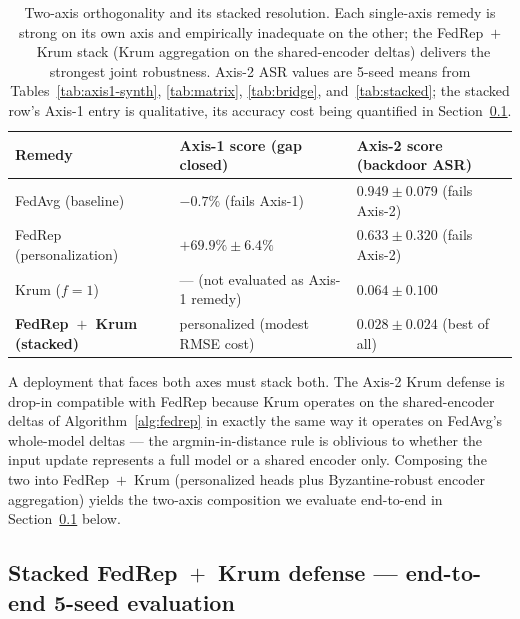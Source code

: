 \documentclass[a4paper,fleqn,doubleblind]{cas-sc}
\newcommand{\tblhead}{\rowcolor{tblHeadBg}}
\newcommand{\zebra}{\rowcolors{2}{tblAltBg}{white}}
\newcommand{\tblhead}{}
\newcommand{\zebra}{}
\begin{document}
\begin{table}[pos=tbp]
\centering
\footnotesize
\setlength{\tabcolsep}{6pt}
\renewcommand{\arraystretch}{1.2}
\caption{Two-axis orthogonality and its stacked resolution. Each
single-axis remedy is strong on its own axis and empirically
inadequate on the other; the FedRep~$+$~Krum stack (Krum aggregation
on the shared-encoder deltas) delivers the strongest joint robustness.
Axis-2 ASR values are 5-seed means from Tables~\ref{tab:axis1-synth},
\ref{tab:matrix}, \ref{tab:bridge}, and~\ref{tab:stacked}; the
stacked row's Axis-1 entry is qualitative, its accuracy cost being
quantified in Section~\ref{sec:bridge-stacked}.}
\label{tab:orthogonality}
\zebra
\begin{tabular}{@{}l l l@{}}
\toprule
\tblhead
Remedy & Axis-1 score (gap closed) & Axis-2 score (backdoor ASR) \\
\midrule
FedAvg (baseline)          & $-0.7\%$ (fails Axis-1)               & $0.949 \pm 0.079$ (fails Axis-2) \\
FedRep (personalization)   & \textbf{$+69.9\% \pm 6.4\%$}          & $0.633 \pm 0.320$ (fails Axis-2) \\
Krum ($f = 1$)             & --- (not evaluated as Axis-1 remedy)  & $0.064 \pm 0.100$ \\
\midrule
\textbf{FedRep~$+$~Krum (stacked)} & personalized (modest RMSE cost) & \textbf{$0.028 \pm 0.024$} (best of all) \\
\bottomrule
\end{tabular}
\end{table}

A deployment that faces both axes must stack both. The Axis-2 Krum
defense is drop-in compatible with FedRep because Krum operates on
the shared-encoder deltas of Algorithm~\ref{alg:fedrep} in exactly
the same way it operates on FedAvg's whole-model deltas --- the
argmin-in-distance rule is oblivious to whether the input update
represents a full model or a shared encoder only. Composing the two
into FedRep~$+$~Krum (personalized heads plus Byzantine-robust
encoder aggregation) yields the two-axis composition we evaluate
end-to-end in Section~\ref{sec:bridge-stacked} below.

\subsection{Stacked FedRep~$+$~Krum defense --- end-to-end 5-seed evaluation}
\label{sec:bridge-stacked}
\end{document}
